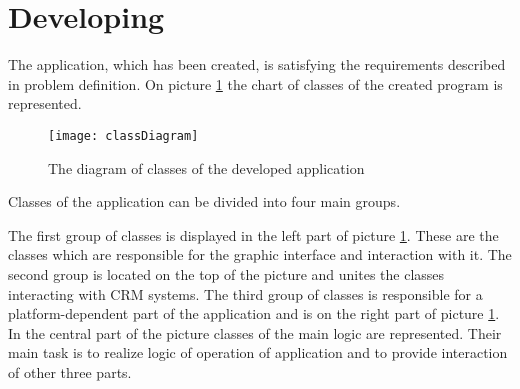 \section{Developing}\label{sec:developing}

The application, which has been created, is satisfying the requirements described in problem definition. On picture \ref {fig:classDiagram} the chart of classes of the created program is represented.

\begin{figure}[tbh]
\centering
\caption{The diagram of classes of the developed application }
\label{fig:classDiagram}
\texttt{[image: classDiagram]}
\end{figure}

Classes of the application can be divided into four main groups.

The first group of classes is displayed in the left part of picture \ref {fig:classDiagram}. These are the classes which are responsible for the graphic interface and interaction with it. The second group is located on the top of the picture and unites the classes interacting with CRM systems. The third group of classes is responsible for a platform-dependent part of the application and is on the right part of picture \ref {fig:classDiagram}. In the central part of the picture classes of the main logic are represented. Their main task is to realize logic of operation of application and to provide interaction of other three parts. 
